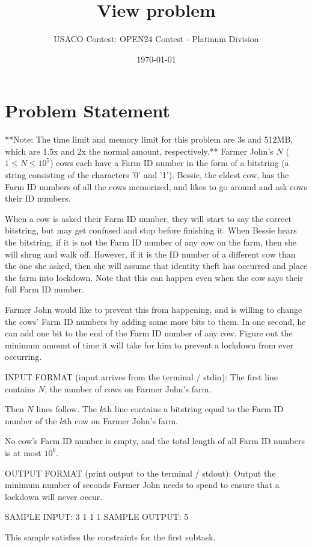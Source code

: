 \documentclass[12pt]{article}
\title{View problem}
\author{USACO Contest: OPEN24 Contest - Platinum Division}
\date{\today}
\begin{document}
\maketitle

\section*{Problem Statement}


**Note: The time limit and memory limit for this problem are 3s and 512MB,
which are 1.5x and 2x the normal amount, respectively.**
Farmer John's $N$ ($1 \leq N \leq 10^5$) cows each have a Farm ID number in the
form of a bitstring (a string consisting of the characters '0' and '1'). Bessie,
the eldest cow, has the Farm ID numbers of all the cows memorized, and likes to
go around and ask cows their ID numbers.

When a cow is asked their Farm ID number, they will start to say the correct
bitstring, but may get confused and stop before finishing it. When Bessie hears
the bitstring, if it is not the Farm ID number of any cow on the farm, then she
will shrug and walk off. However, if it is the ID number of a different cow than
the one she asked, then she will assume that identity theft has occurred and
place the farm into lockdown. Note that this can happen even when the cow says
their full Farm ID number.

Farmer John would like to prevent this from happening, and is willing to change
the cows' Farm ID numbers by adding some more bits to them. In one second, he
can add one bit to the end of the Farm ID number of any cow. Figure out the
minimum amount of time it will take for him to prevent a lockdown from ever
occurring.

INPUT FORMAT (input arrives from the terminal / stdin):
The first line contains $N$, the number of cows on Farmer John's farm.

Then $N$ lines follow. The $k$th line contains a bitstring equal to the Farm ID
number of the $k$th cow on Farmer John's farm.

No cow's Farm ID number is empty, and the total length of all Farm ID numbers is
at most $10^6$.

OUTPUT FORMAT (print output to the terminal / stdout):
Output the minimum number of seconds Farmer John needs to spend to ensure that a
lockdown will never occur.

SAMPLE INPUT:
3
1
1
1
SAMPLE OUTPUT: 
5

This sample satisfies the constraints for the first subtask.
\end{document}
